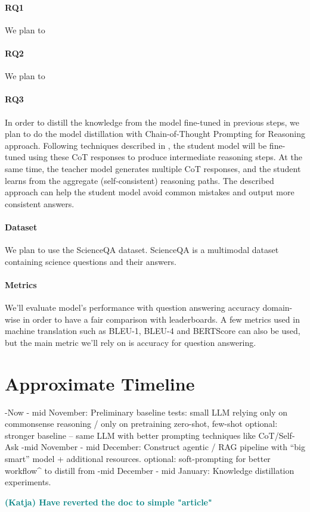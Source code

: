 \documentclass[10pt]{article}
\newcommand{\katja}[1]{\textbf{\textcolor{teal}{(Katja) #1}}}
\begin{document}
\paragraph{RQ1} 
We plan to 

\paragraph{RQ2}
We plan to

\paragraph{RQ3}
In order to distill the knowledge from the model fine-tuned in previous steps, we plan to do the model distillation with Chain-of-Thought Prompting for Reasoning approach. Following techniques described in \cite{magister2022teaching} \cite{wei2022chain}, the student model will be fine-tuned using these CoT responses to produce intermediate reasoning steps. At the same time, the teacher model generates multiple CoT responses, and the student learns from the aggregate (self-consistent) reasoning paths. The described approach can help the student model avoid common mistakes and output more consistent answers.

\paragraph{Dataset}
We plan to use the ScienceQA dataset. ScienceQA is a multimodal dataset containing science questions and their answers.

\paragraph{Metrics}
We'll evaluate model's performance with question answering accuracy domain-wise in order to have a fair comparison with leaderboards. A few metrics used in machine translation such as BLEU-1, BLEU-4 and BERTScore can also be used, but the main metric we'll rely on is accuracy for question answering.

\section{Approximate Timeline}
-Now - mid November: 
  Preliminary baseline tests: small LLM relying only on commonsense reasoning / only on pretraining 
  zero-shot, few-shot
  optional: stronger baseline – same LLM with better prompting techniques like CoT/Self-Ask
-mid November - mid December:
  Construct agentic / RAG pipeline with “big smart” model + additional resources.
  optional: soft-prompting for better workflow^ to distill from
-mid December - mid January:
  Knowledge distillation experiments.


\katja{Have reverted the doc to simple "article"}



\end{document}
